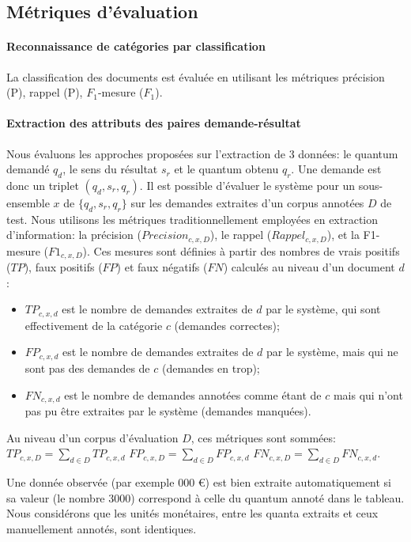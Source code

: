 \subsection{Métriques d'évaluation}
\paragraph{Reconnaissance de catégories par classification}

La classification des documents est évaluée en utilisant les métriques précision (P), rappel (P), $F_1$-mesure ($F_1$). %

\paragraph{Extraction des attributs des paires demande-résultat}
 Nous évaluons les approches proposées sur l'extraction de 3 données: le quantum demandé $q_d$, le sens du résultat $s_r$ et le quantum obtenu $q_r$. Une demande est donc un triplet $(q_d, s_r, q_r)$. Il est possible d'évaluer le système pour un sous-ensemble $x$ de $\lbrace q_d, s_r, q_r \rbrace$ sur les demandes extraites d'un corpus annotées $D$ de test. Nous utilisons les métriques traditionnellement employées en extraction d'information: la précision ($Precision_{c,x,D}$), le rappel ($Rappel_{c,x,D}$), et la F1-mesure ($F1_{c,x,D}$). Ces mesures sont définies à partir des nombres de vrais positifs ($TP$), faux positifs ($FP$) et faux négatifs ($FN$) calculés au niveau d'un document $d$:
\begin{itemize}
\item $TP_{c, x, d}$ est le nombre de demandes extraites de $d$ par le système, qui sont effectivement de la catégorie $c$ (demandes correctes);
\item $FP_{c, x, d}$ est le nombre de demandes extraites de $d$ par le système, mais qui ne sont pas des demandes de $c$ (demandes en trop);
\item $FN_{c, x, d}$ est le nombre de demandes annotées comme étant de $c$ mais qui n'ont pas pu être extraites par le système (demandes manquées).
\end{itemize}

Au niveau d'un corpus d'évaluation $D$, ces métriques sont sommées: 
$TP_{c,x,D} = \sum\limits_{d \in D} TP_{c,x,d}$ \hfill $FP_{c,x,D} = \sum\limits_{d \in D} FP_{c,x,d}$ \hfill $ FN_{c,x,D} = \sum\limits_{d \in D} FN_{c,x,d}$.

Une donnée observée (par exemple  000 \euro \fg) est bien extraite automatiquement si sa valeur (le nombre $3000$) correspond à celle du quantum annoté dans le tableau. Nous considérons que les unités monétaires, entre les quanta extraits et ceux manuellement annotés, sont identiques.

